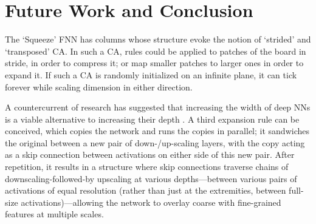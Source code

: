 \documentclass{article}
\begin{document}








\section{Future Work and Conclusion}

The `Squeeze' FNN has columns whose structure evoke the notion of `strided' and `transposed' CA.
In such a CA, rules could be applied to patches of the board in stride, in order to compress it; or map smaller patches to larger ones in order to expand it. 
If such a CA is randomly initialized on an infinite plane, it can tick forever while scaling dimension in either direction. 

A countercurrent of research has suggested that increasing the width of deep NNs is a viable alternative to increasing their depth \cite{zagoruyko2016wide}.
A third expansion rule can be conceived, which copies the network and runs the copies in parallel; it sandwiches the original between a new pair of down-/up-scaling layers, with the copy acting as a skip connection between activations on either side of this new pair.
After repetition, it results in a structure where skip connections traverse chains of downscaling-followed-by upscaling at various depths---between various pairs of activations of equal resolution (rather than just at the extremities, between full-size activations)---allowing the network to overlay coarse with fine-grained features at multiple scales.
\end{document}
